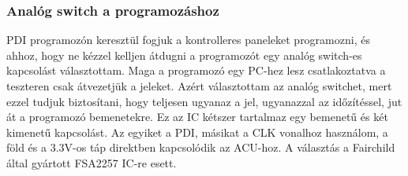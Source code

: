 \documentclass[a4paper, 12pt]{article}
\newcommand{\tab}{\hspace*{1em}}
\begin{document}
\subsubsection{Analóg switch a programozáshoz}
\tab PDI programozón keresztül fogjuk a kontrolleres paneleket programozni, és ahhoz, hogy ne kézzel kelljen átdugni a programozót egy analóg switch-es kapcsolást választottam. Maga a programozó egy PC-hez lesz csatlakoztatva a teszteren csak átvezetjük a jeleket. Azért választottam az analóg switchet, mert ezzel tudjuk biztosítani, hogy teljesen ugyanaz a jel, ugyanazzal az időzítéssel, jut át a programozó bemenetekre. Ez az IC kétszer tartalmaz egy bemenetű és két kimenetű kapcsolást. Az egyiket a PDI, másikat a CLK vonalhoz használom, a föld és a 3.3V-os táp direktben kapcsolódik az ACU-hoz. A választás a Fairchild\texttrademark{} által gyártott FSA2257\cite{switch} IC-re esett.
\end{document}
